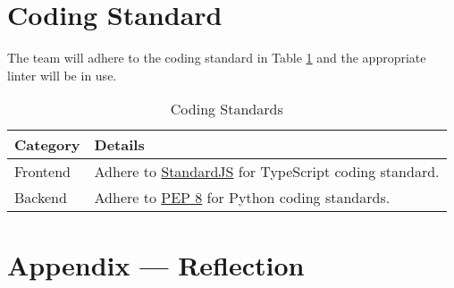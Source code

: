 \documentclass{article}
\begin{document}
\newpage

\section{Coding Standard}

The team will adhere to the coding standard in Table \ref{table:5} and the appropriate linter will be in use.
\begin{table}[htbp]
    \centering
    \begin{tabularx}{\textwidth}{|l|>{\raggedright\arraybackslash}X|}
    \hline
    \textbf{Category} & \textbf{Details} \\
    \hline
    Frontend & Adhere to \href{https://standardjs.com/}{StandardJS} for
    TypeScript coding standard. \\
    \hline
    Backend & Adhere to
    \href{https://www.python.org/dev/peps/pep-0008/}{PEP 8} for Python coding
    standards. \\
    \hline
    \end{tabularx}
    \caption{Coding Standards}
    \label{table:5}
\end{table}


\newpage{}

\section*{Appendix --- Reflection}
\end{document}

